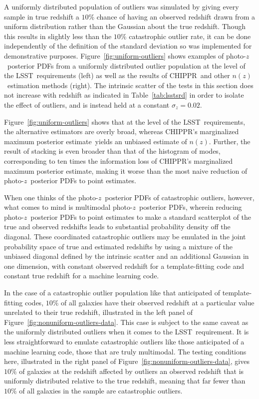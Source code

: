 \documentclass[iop]{emulateapj}
\newcommand{\Fig}[1]{Figure~\ref{#1}}
\newcommand{\project}[1]{\textsc{#1}}
\newcommand{\lsst}{\project{LSST}}
\newcommand{\Chippr}{\project{CHIPPR}}
\newcommand{\pz}{photo-$z$}
\newcommand{\pzpdf}{\pz\ posterior PDF}
\newcommand{\nz}{$n(z)$}
\newcommand{\mmle}{marginalized maximum posterior estimate}
\begin{document}
A uniformly distributed population of outliers was simulated by giving every sample in true redshift a $10\%$ chance of having an observed redshift drawn from a uniform distribution rather than the Gaussian about the true redshift.
Though this results in slightly less than the $10\%$ catastrophic outlier rate, it can be done independently of the definition of the standard deviation so was implemented for demonstrative purposes.
\Fig{fig:uniform-outliers} shows examples of \pzpdf s from a uniformly distributed outlier population at the level of the \lsst\ requirements (left) as well as the results of \Chippr\ and other \nz\ estimation methods (right).
The intrinsic scatter of the tests in this section does not increase with redshift as indicated in Table~\ref{tab:lsstsrd}
in order to isolate the effect of outliers, and is instead held at a constant $\sigma_{z} = 0.02$.

\Fig{fig:uniform-outliers} shows that at the level of the \lsst\ requirements, the alternative estimators are overly broad, whereas \Chippr's \mmle\ yields an unbiased estimate of \nz.
Further, the result of stacking is even broader than that of the histogram of modes, corresponding to ten times the information loss of \Chippr's \mmle, making it worse than the most naive reduction of \pzpdf s to point estimates.

When one thinks of the \pzpdf s of catastrophic outliers, however, what comes to mind is multimodal \pzpdf s, wherein reducing \pzpdf s to point estimates to make a standard scatterplot of the true and observed redshifts leads to substantial probability density off the diagonal.
These coordinated catastrophic outliers may be emulated in the joint probability space of true and estimated redshifts by using a mixture of the unbiased diagonal defined by the intrinsic scatter and an additional Gaussian in one dimension, with constant observed redshift for a template-fitting code and constant true redshift for a machine learning code.

In the case of a catastrophic outlier population like that anticipated of template-fitting codes, $10\%$ of all galaxies have their observed redshift at a particular value unrelated to their true redshift, illustrated in the left panel of \Fig{fig:nonuniform-outliers-data}.
This case is subject to the same caveat as the uniformly distributed outliers when it comes to the \lsst\ requirement.
It is less straightforward to emulate catastrophic outliers like those anticipated of a machine learning code, those that are truly multimodal.
The testing conditions here, illustrated in the right panel of \Fig{fig:nonuniform-outliers-data}, gives $10\%$ of galaxies at the redshift affected by outliers an observed redshift that is uniformly distributed relative to the true redshift, meaning that far fewer than $10\%$ of all galaxies in the sample are catastrophic outliers.
\end{document}
